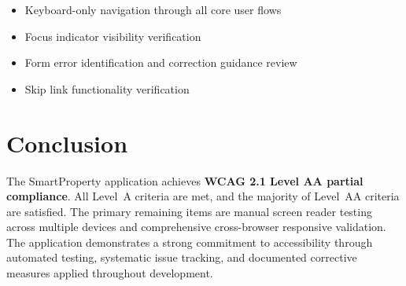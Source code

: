 \documentclass[12pt,a4paper]{article}
\begin{document}
\begin{itemize}[noitemsep]
    \item Keyboard-only navigation through all core user flows
    \item Focus indicator visibility verification
    \item Form error identification and correction guidance review
    \item Skip link functionality verification
\end{itemize}

\section{Conclusion}

The SmartProperty application achieves \textbf{WCAG 2.1 Level AA partial compliance}. All Level~A criteria are met, and the majority of Level~AA criteria are satisfied. The primary remaining items are manual screen reader testing across multiple devices and comprehensive cross-browser responsive validation. The application demonstrates a strong commitment to accessibility through automated testing, systematic issue tracking, and documented corrective measures applied throughout development.
\end{document}
